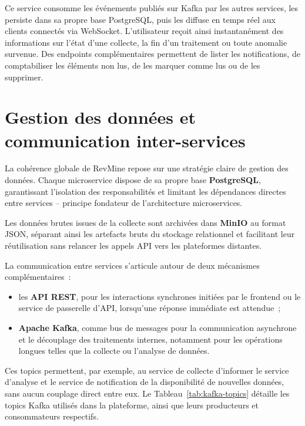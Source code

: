 Ce service consomme les événements publiés sur Kafka par les autres services, les persiste dans
sa propre base PostgreSQL, puis les diffuse en temps réel aux clients connectés via WebSocket.
L'utilisateur reçoit ainsi instantanément des informations sur l'état d'une collecte, la fin
d'un traitement ou toute anomalie survenue. Des endpoints complémentaires permettent de lister
les notifications, de comptabiliser les éléments non lus, de les marquer comme lus ou de les
supprimer.

\section{Gestion des données et communication inter-services}

La cohérence globale de RevMine repose sur une stratégie claire de gestion des données. Chaque
microservice dispose de sa propre base \textbf{PostgreSQL}, garantissant l'isolation des
responsabilités et limitant les dépendances directes entre services -- principe fondateur de
l'architecture microservices.

Les données brutes issues de la collecte sont archivées dans \textbf{MinIO} au format JSON,
séparant ainsi les artefacts bruts du stockage relationnel et facilitant leur réutilisation sans
relancer les appels API vers les plateformes distantes.

La communication entre services s'articule autour de deux mécanismes complémentaires~:

\begin{itemize}
    \item les \textbf{API REST}, pour les interactions synchrones initiées par le frontend ou le
          service de passerelle d'API, lorsqu'une réponse immédiate est attendue~;
    \item \textbf{Apache Kafka}, comme bus de messages pour la communication asynchrone et le
          découplage des traitements internes, notamment pour les opérations longues telles que
          la collecte ou l'analyse de données.
\end{itemize}

Ces topics permettent, par exemple, au service de collecte d'informer le service d'analyse et
le service de notification de la disponibilité de nouvelles données, sans aucun couplage direct
entre eux. Le Tableau~\ref{tab:kafka-topics} détaille les topics Kafka utilisés dans la
plateforme, ainsi que leurs producteurs et consommateurs respectifs.


